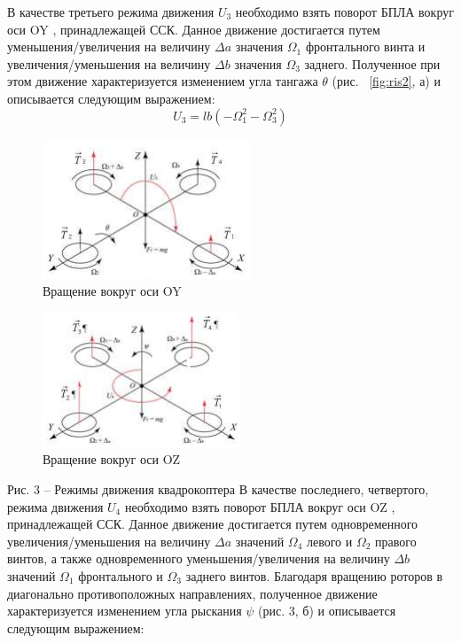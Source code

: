 В качестве третьего режима движения \(U_{3}\) необходимо взять поворот БПЛА вокруг оси OY , принадлежащей ССК. Данное движение достигается путем уменьшения/увеличения на величину \(\Delta a\) значения \(\Omega_{1}\) фронтального винта и увеличения/уменьшения на величину \(\Delta b\) значения \(\Omega_{3}\) заднего. Полученное при этом движение характеризуется изменением угла тангажа \(\theta\) (рис. ~\ref{fig:ris2}, а) и описывается следующим выражением:
\begin{equation}
U_{3}=lb(-\Omega_{1}^2-\Omega_{3}^2)
\end{equation}
\begin{figure}[H]
	\centering
	\includegraphics[width=0.5\linewidth]{pics/ris3}
	\caption{Вращение вокруг оси OY
	}
	\label{fig:ris3} %
\end{figure}
\begin{figure}[H]
	\centering
	\includegraphics[width=0.5\linewidth]{pics/ris4}
	\caption{Вращение вокруг оси OZ
	}
	\label{fig:ris4} %
\end{figure}
Рис. 3 – Режимы движения квадрокоптера
В качестве последнего, четвертого, режима движения \(U_{4}\) необходимо взять поворот БПЛА вокруг оси OZ , принадлежащей ССК. Данное движение достигается путем одновременного увеличения/уменьшения на величину \(\Delta a\) значений \(\Omega_{4}\) левого и \(\Omega_{2}\) правого винтов, а также одновременного уменьшения/увеличения на величину \(\Delta b\) значений \(\Omega_{1}\) фронтального и \(\Omega_{3}\) заднего винтов. Благодаря вращению роторов в диагонально противоположных направлениях, полученное движение характеризуется изменением угла рыскания \(\psi\) (рис. 3, б) и описывается следующим выражением:
